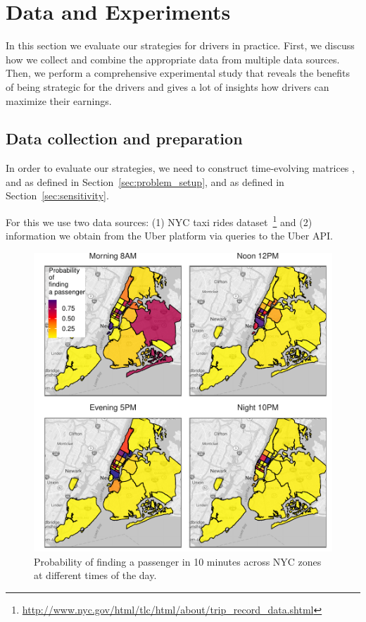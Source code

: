 
\section{Data and Experiments}
\label{sec:experiments}
In this section we  evaluate our strategies for drivers 
in practice. First, we discuss how we collect and combine the appropriate data 
from multiple data sources. Then, we perform a comprehensive experimental study
that reveals the benefits of being strategic for the drivers and gives a lot of insights
how drivers can maximize their earnings.

\subsection{Data collection and preparation}
In order to evaluate our strategies, we need to construct 
time-evolving matrices 
{\empiricaltransitionmatrix}, {\traveltimematrix} and {\rewardsmatrix} as defined in Section~\ref{sec:problem_setup},
and {\countmatrix} as defined in Section~\ref{sec:sensitivity}.

For this we use two data sources: (1) NYC taxi rides 
dataset~\footnote{\url{http://www.nyc.gov/html/tlc/html/about/trip_record_data.shtml}} and
(2) information we obtain from the Uber platform via queries to the Uber API.

\begin{figure}
	\centering
	\includegraphics{figures/successful_heatmap.pdf}
	\caption{Probability of finding a passenger in 10 minutes across NYC zones at different times of the day.}
	\label{fig:successful_heatmap}
\end{figure}


